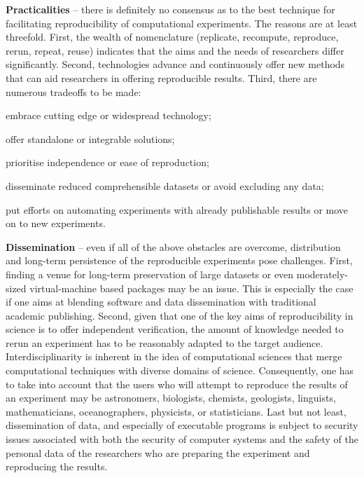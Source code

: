 {\bf Practicalities} -- there is definitely no consensus as to the
  best technique for facilitating reproducibility of computational
  experiments. 
The reasons are at least threefold. 
First, the wealth of nomenclature (replicate, recompute, reproduce, 
  rerun, repeat, reuse) indicates that the aims and the needs of researchers
  differ significantly.
Second, technologies advance and continuously offer new methods that can
  aid researchers in offering reproducible results.
Third, there are numerous tradeoffs to be made: 
  \begin{inparaenum}[(i)]
  \item embrace cutting edge or widespread technology; 
  \item offer standalone or integrable solutions; 
  \item prioritise independence or ease of reproduction; 
  \item disseminate reduced comprehensible datasets or avoid excluding any data;
  \item put efforts on automating experiments with already publishable results
  or move on to new experiments.
  \end{inparaenum}
    
{\bf Dissemination} -- even if all of the above obstacles are overcome, 
  distribution and long-term persistence of the reproducible experiments
  pose challenges.
First, finding a venue for long-term preservation of large datasets or even 
  moderately-sized virtual-machine based packages may be an issue.
This is especially the case if one aims at blending software and data
  dissemination with traditional academic publishing.
Second, given that one of the key aims of reproducibility in science
  is to offer independent verification, the amount of knowledge 
  needed to rerun an experiment has to be reasonably adapted to the
  target audience.
Interdisciplinarity is inherent in the idea of computational sciences that
  merge computational techniques with diverse domains of science.
Consequently, one has to take into account that the users who will attempt to
  reproduce the results of an experiment may be
  astronomers, biologists, chemists, geologists, linguists, mathematicians,
  oceanographers, physicists, or statisticians.
Last but not least, dissemination of data, and especially of executable
  programs is subject to security issues associated with both the security
  of computer systems and the safety of the personal data of the researchers who
  are preparing the experiment and reproducing the results.
